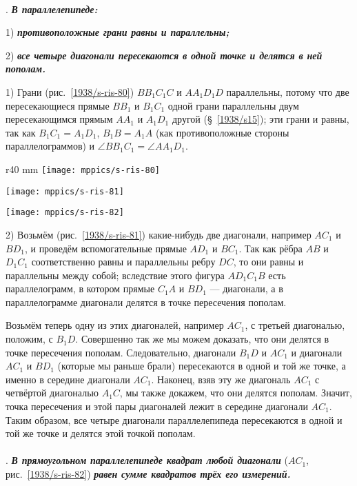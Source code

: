 \paragraph{}\label{1938/s72}
\mbox{.}
\textbf{\emph{В параллелепипеде:}}

1) \textbf{\emph{противоположные грани равны и параллельны;}}

2) \textbf{\emph{все четыре диагонали пересекаются в одной точке и делятся в ней пополам.}}

1) Грани (рис.~\ref{1938/s-ris-80}) $BB_1C_1C$ и $AA_1D_1D$ параллельны, потому что две пересекающиеся прямые $BB_1$ и $B_1C_1$ одной грани параллельны двум пересекающимся прямым $AA_1$ и $A_1D_1$ другой (§~\ref{1938/s15});
эти грани и равны, так как $B_1C_1=A_1D_1$, $B_1B=A_1A$ (как противоположные стороны параллелограммов) и $\angle BB_1C_1=\angle AA_1D_1$.

\begin{wrapfigure}[35]{r}{40 mm}
\vskip-0mm
\centering
\texttt{[image: mppics/s-ris-80]}
\caption{}\label{1938/s-ris-80}
\bigskip
\texttt{[image: mppics/s-ris-81]}
\caption{}\label{1938/s-ris-81}
\bigskip
\texttt{[image: mppics/s-ris-82]}
\caption{}\label{1938/s-ris-82}
\end{wrapfigure}

2) Возьмём (рис.~\ref{1938/s-ris-81}) какие-нибудь две диагонали, например $AC_1$ и $BD_1$, и проведём вспомогательные прямые $AD_1$ и $BC_1$.
Так как рёбра $AB$ и $D_1C_1$ соответственно равны и параллельны ребру $DC$, то они равны и параллельны между собой;
вследствие этого фигура $AD_1C_1B$ есть параллелограмм, в котором прямые $C_1A$ и $BD_1$ — диагонали, а в параллелограмме диагонали делятся в точке пересечения пополам.

Возьмём теперь одну из этих диагоналей, например $AC_1$, с третьей диагональю, положим, с $B_1D$.
Совершенно так же мы можем доказать, что они делятся в точке пересечения пополам.
Следовательно, диагонали $B_1D$ и $AC_1$ и диагонали $AC_1$ и $BD_1$ (которые мы раньше брали) пересекаются в одной и той же точке, а именно в середине диагонали $AC_1$.
Наконец, взяв эту же диагональ $AC_1$ с четвёртой диагональю $A_1C$, мы также докажем, что они делятся пополам.
Значит, точка пересечения и этой пары диагоналей лежит в середине диагонали $AC_1$.
Таким образом, все четыре диагонали параллелепипеда пересекаются в одной и той же точке и делятся этой точкой пополам.

\paragraph{}\label{1938/s73}
\mbox{.}
\textbf{\emph{В прямоугольном параллелепипеде квадрат любой диагонали}} ($AC_1$, рис.~\ref{1938/s-ris-82}) \textbf{\emph{равен сумме квадратов трёх его измерений.}}

